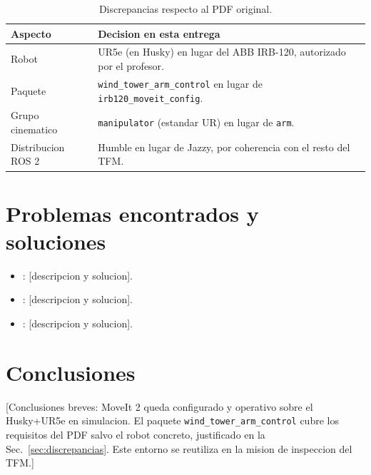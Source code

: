 \documentclass[11pt,a4paper]{article}
\begin{document}
\begin{table}[H]
  \centering
  \caption{Discrepancias respecto al PDF original.}
  \label{tab:discrepancias}
  \begin{tabularx}{\linewidth}{lX}
    \toprule
    Aspecto & Decision en esta entrega \\
    \midrule
    Robot                  & UR5e (en Husky) en lugar del ABB IRB-120, autorizado por el profesor. \\
    Paquete                & \texttt{wind\_tower\_arm\_control} en lugar de \texttt{irb120\_moveit\_config}. \\
    Grupo cinematico       & \texttt{manipulator} (estandar UR) en lugar de \texttt{arm}. \\
    Distribucion ROS 2     & Humble en lugar de Jazzy, por coherencia con el resto del TFM. \\
    \bottomrule
  \end{tabularx}
\end{table}

\section{Problemas encontrados y soluciones}
\label{sec:problemas}


\begin{itemize}
  \item [Problema 1]: [descripcion y solucion].
  \item [Problema 2]: [descripcion y solucion].
  \item [Problema 3]: [descripcion y solucion].
\end{itemize}

\section{Conclusiones}
\label{sec:conclusiones}

[Conclusiones breves: MoveIt 2 queda configurado y operativo sobre el
Husky+UR5e en simulacion. El paquete \texttt{wind\_tower\_arm\_control} cubre
los requisitos del PDF salvo el robot concreto, justificado en la
Sec.~\ref{sec:discrepancias}. Este entorno se reutiliza en la mision de
inspeccion del TFM.]
\end{document}
